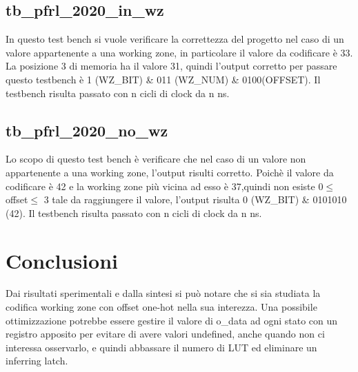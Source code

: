 \documentclass[12pt]{article}
\begin{document}
\subsection{\textbf{tb\_pfrl\_2020\_in\_wz}}
In questo test bench si vuole verificare la correttezza del progetto nel caso di un valore appartenente a una working zone, in particolare il valore da codificare è 33.
La posizione 3 di memoria ha il valore 31, quindi l'output corretto per passare questo testbench è 1 (WZ\_BIT) \& 011 (WZ\_NUM) \& 0100(OFFSET).
Il testbench risulta passato con n cicli di clock da n ns.
\subsection{\textbf{tb\_pfrl\_2020\_no\_wz}}
Lo scopo di questo test bench è verificare che nel caso di un valore non appartenente a una working zone, l'output risulti corretto.
Poichè il valore da codificare è 42 e la working zone più vicina ad esso è 37,quindi non esiste 0\(\leq\)offset\(\leq\) 3 tale da raggiungere il valore, l'output risulta 0 (WZ\_BIT) \& 0101010 (42).
Il testbench risulta passato con n cicli di clock da n ns.
\section{Conclusioni}
Dai risultati sperimentali e dalla sintesi si può notare che si sia studiata la codifica working zone con offset one-hot nella sua interezza.
Una possibile ottimizzazione potrebbe essere gestire il valore di o\_data ad ogni stato con un registro apposito per evitare di avere valori undefined, anche quando non ci interessa osservarlo, e quindi abbassare il numero di LUT ed eliminare un inferring latch.
\end{document}
